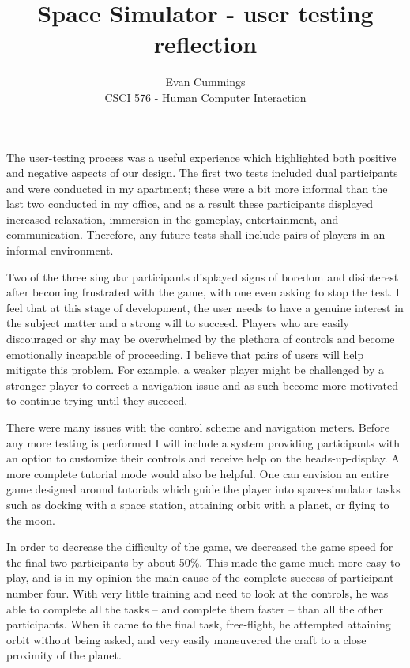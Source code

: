 
\usepackage[top=1in, bottom=1in, left=1in, right=1in]{geometry}



\title{Space Simulator - user testing reflection}
\author{Evan Cummings\\
CSCI 576 - Human Computer Interaction}

\maketitle

The user-testing process was a useful experience which highlighted both positive and negative aspects of our design.  The first two tests included dual participants and were conducted in my apartment; these were a bit more informal than the last two conducted in my office,  and as a result these participants displayed increased relaxation, immersion in the gameplay, entertainment, and communication.  Therefore, any future tests shall include pairs of players in an informal environment.

Two of the three singular participants displayed signs of boredom and disinterest after becoming frustrated with the game, with one even asking to stop the test.  I feel that at this stage of development, the user needs to have a genuine interest in the subject matter and a strong will to succeed.  Players who are easily discouraged or shy may be overwhelmed by the plethora of controls and become emotionally incapable of proceeding.  I believe that pairs of users will help mitigate this problem.  For example, a weaker player might be challenged by a stronger player to correct a navigation issue and as such become more motivated to continue trying until they succeed.

There were many issues with the control scheme and navigation meters.  Before any more testing is performed I will include a system providing participants with an option to customize their controls and receive help on the heads-up-display.  A more complete tutorial mode would also be helpful.  One can envision an entire game designed around tutorials which guide the player into space-simulator tasks such as docking with a space station, attaining orbit with a planet, or flying to the moon.

In order to decrease the difficulty of the game, we decreased the game speed for the final two participants by about 50\%.  This made the game much more easy to play, and is in my opinion the main cause of the complete success of participant number four.  With very little training and need to look at the controls, he was able to complete all the tasks -- and complete them faster -- than all the other participants.  When it came to the final task, free-flight, he attempted attaining orbit without being asked, and very easily maneuvered the craft to a close proximity of the planet.

